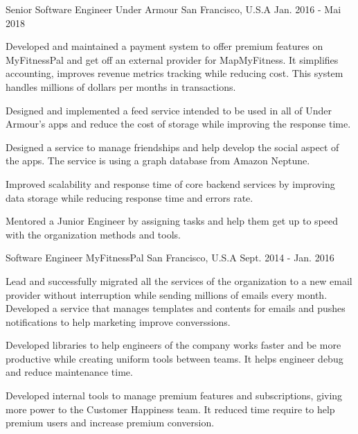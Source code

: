 \begin{cventries}
  \cventry
    {Senior Software Engineer}
    {Under Armour}
    {San Francisco, U.S.A}
    {Jan. 2016 - Mai 2018}
    {
      \begin{cvitems}
	\item{Developed and maintained a payment system to offer premium features on MyFitnessPal and get off an external provider for MapMyFitness. It simplifies accounting, improves revenue metrics tracking while reducing cost. This system handles millions of dollars per months in transactions. }
	\item {Designed and implemented a feed service intended to be used in all of Under Armour's apps and reduce the cost of storage while improving the response time.}
        \item {Designed a service to manage friendships and help develop the social aspect of the apps. The service is using a graph database from Amazon Neptune. }
	\item{Improved scalability and response time of core backend services by improving data storage while reducing response time and errors rate.}
	\item {Mentored a Junior Engineer by assigning tasks and help them get up to speed with the organization methods and tools.}
      \end{cvitems}
    }
    
  \cventry
    {Software Engineer}
    {MyFitnessPal}
    {San Francisco, U.S.A}
    {Sept. 2014 - Jan. 2016}
    {
      \begin{cvitems}	
        \item {Lead and successfully migrated all the services of the organization to a new email provider without interruption while sending millions of emails every month. Developed a service that manages templates and contents for emails and pushes notifications to help marketing improve converssions.}
        \item {Developed libraries to help engineers of the company works faster and be more productive while creating uniform tools between teams. It helps engineer debug and reduce maintenance time.}
        \item{Developed internal tools to manage premium features and subscriptions, giving more power to the Customer Happiness team. It reduced time require to help premium users and increase premium conversion.}
      \end{cvitems}
    }



\end{cventries}
